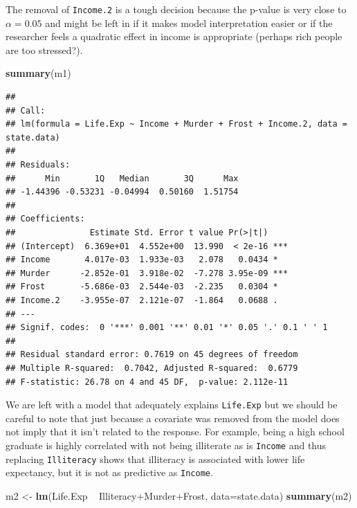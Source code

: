 \documentclass[]{book}
\newenvironment{Shaded}{\begin{snugshade}}{\end{snugshade}}
\newcommand{\KeywordTok}[1]{\textcolor[rgb]{0.13,0.29,0.53}{\textbf{{#1}}}}
\newcommand{\DataTypeTok}[1]{\textcolor[rgb]{0.13,0.29,0.53}{{#1}}}
\newcommand{\StringTok}[1]{\textcolor[rgb]{0.31,0.60,0.02}{{#1}}}
\newcommand{\NormalTok}[1]{{#1}}
\theoremstyle{definition}
\theoremstyle{definition}
\theoremstyle{remark}
\begin{document}
The removal of \texttt{Income.2} is a tough decision because the p-value
is very close to \(\alpha=0.05\) and might be left in if it makes model
interpretation easier or if the researcher feels a quadratic effect in
income is appropriate (perhaps rich people are too stressed?).

\begin{Shaded}
\begin{Highlighting}[]
\KeywordTok{summary}\NormalTok{(m1)}
\end{Highlighting}
\end{Shaded}

\begin{verbatim}
## 
## Call:
## lm(formula = Life.Exp ~ Income + Murder + Frost + Income.2, data = state.data)
## 
## Residuals:
##      Min       1Q   Median       3Q      Max 
## -1.44396 -0.53231 -0.04994  0.50160  1.51754 
## 
## Coefficients:
##               Estimate Std. Error t value Pr(>|t|)    
## (Intercept)  6.369e+01  4.552e+00  13.990  < 2e-16 ***
## Income       4.017e-03  1.933e-03   2.078   0.0434 *  
## Murder      -2.852e-01  3.918e-02  -7.278 3.95e-09 ***
## Frost       -5.686e-03  2.544e-03  -2.235   0.0304 *  
## Income.2    -3.955e-07  2.121e-07  -1.864   0.0688 .  
## ---
## Signif. codes:  0 '***' 0.001 '**' 0.01 '*' 0.05 '.' 0.1 ' ' 1
## 
## Residual standard error: 0.7619 on 45 degrees of freedom
## Multiple R-squared:  0.7042, Adjusted R-squared:  0.6779 
## F-statistic: 26.78 on 4 and 45 DF,  p-value: 2.112e-11
\end{verbatim}

We are left with a model that adequately explains \texttt{Life.Exp} but
we should be careful to note that just because a covariate was removed
from the model does not imply that it isn't related to the response. For
example, being a high school graduate is highly correlated with not
being illiterate as is \texttt{Income} and thus replacing
\texttt{Illiteracy} shows that illiteracy is associated with lower life
expectancy, but it is not as predictive as \texttt{Income}.

\begin{Shaded}
\begin{Highlighting}[]
\NormalTok{m2 <-}\StringTok{ }\KeywordTok{lm}\NormalTok{(Life.Exp ~}\StringTok{ }\NormalTok{Illiteracy+Murder+Frost, }\DataTypeTok{data=}\NormalTok{state.data)}
\KeywordTok{summary}\NormalTok{(m2)}
\end{Highlighting}
\end{Shaded}
\end{document}
